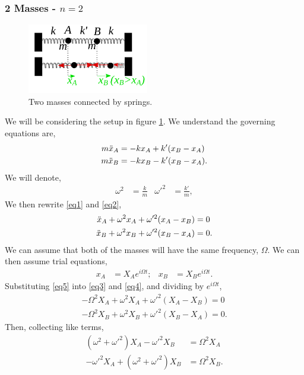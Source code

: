 \documentclass{book}
\begin{document}
\subsubsection{2 Masses - $n = 2$}
\begin{figure}
    \centering
    \includegraphics[width=150pt]{coupled_osc14.pdf}  
    \caption{Two masses connected by springs.}
    \label{fig:doublemass}
\end{figure}
We will be considering the setup in figure \ref{fig:doublemass}. We understand the governing equations are,
\begin{align}
    m\Ddot{x}_A & = -kx_A + k'(x_B - x_A)\label{eq1} \\
    m\Ddot{x}_B & = -kx_B - k'(x_B - x_A)\label{eq2}.
\end{align}
We will denote,
\begin{align*}
    \omega^2 & = \frac{k}{m} & \omega'^2 & = \frac{k'}{m},
\end{align*}
We then rewrite \eqref{eq1} and \eqref{eq2},
\begin{align}
    \Ddot{x}_A + \omega^2x_A + \omega'^2(x_A - x_B) & = 0 \label{eq3} \\
    \Ddot{x}_B + \omega^2x_B + \omega'^2(x_B - x_A) & = 0.\label{eq4}
\end{align}
We can assume that both of the masses will have the same frequency, $\Omega$. We can then assume trial equations,
\begin{align}
    x_A & = X_Ae^{i\Omega t}; & x_B & = X_Be^{i\Omega t}.\label{eq5}
\end{align}
Substituting \eqref{eq5} into \eqref{eq3} and \eqref{eq4}, and dividing by $e^{i\Omega t}$,
\begin{align}
    -\Omega^2X_A + \omega^2X_A + \omega'^2(X_A-X_B) = 0 \label{eq6} \\
    -\Omega^2X_B + \omega^2X_B + \omega'^2(X_B-X_A) = 0\label{eq7}.
\end{align}
Then, collecting like terms,
\begin{align}
    (\omega^2 + \omega'^2)X_A - \omega'^2X_B &= \Omega^2X_A \label{eq8} \\
    -\omega'^2X_A + (\omega^2 + \omega'^2)X_B &= \Omega^2X_B. \label{eq9}
\end{align}
\end{document}
